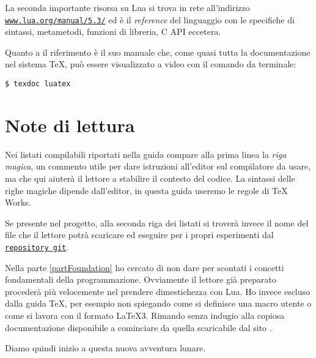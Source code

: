 La seconda importante risorsa su Lua si trova in rete all'indirizzo
\href{https://www.lua.org/manual/5.3/}{\texttt{www.lua.org/manual/5.3/}} ed è il
\emph{reference} del linguaggio \cite{web:luaref} con le specifiche di sintassi,
metametodi, funzioni di libreria, C API eccetera.

Quanto a \LuaTeX{} il riferimento è il suo manuale \cite{prg:luatex} che, come
quasi tutta la documentazione nel sistema \TeX{}, può essere visualizzato a
video con il comando da terminale:
\begin{Verbatim}[numbers=none]
$ texdoc luatex
\end{Verbatim}


\section{Note di lettura}

Nei listati compilabili riportati nella guida compare alla prima linea la
\emph{riga magica}, un commento utile per dare istruzioni all'editor sul
compilatore da usare, ma che qui aiuterà il lettore a stabilire il contesto del
codice. La sintassi delle righe magiche dipende dall'editor, in questa guida
useremo le regole di TeX Works.

Se presente nel progetto, alla seconda riga dei listati si troverà invece il
nome del file che il lettore potrà scaricare ed eseguire per i propri
esperimenti dal \href{https://github.com/GuITeX/guidalua}{\texttt{repository
git}}.

Nella parte \ref{partFoundation} ho cercato di non dare per scontati i concetti
fondamentali della programmazione. Ovviamente il lettore già preparato procederà
più velocemente nel prendere dimestichezza con Lua. Ho invece escluso dalla
guida \TeX{}, per esempio non spiegando come si definisce una macro utente o
come si lavora con il formato \LaTeX3. Rimando senza indugio alla copiosa
documentazione disponibile a cominciare da quella scaricabile dal sito \GuIT.

Diamo quindi inizio a questa nuova avventura lunare.

